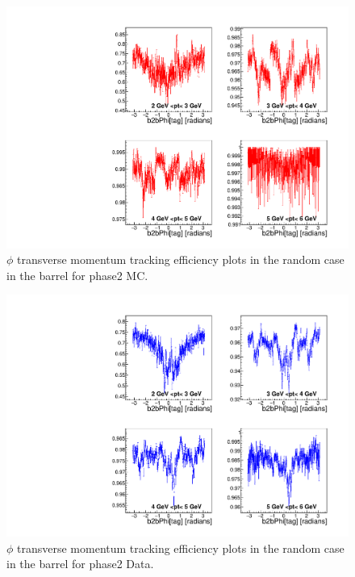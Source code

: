 \documentclass[a4paper,11pt,twosided,final,german,openbib,pdftex,listof=totoc,bibliography=totoc]{scrbook}
\begin{document}
\begin{appendix}
\clearpage
\begin{figure}[!htbp]
	\centering
	\includegraphics[width=\textwidth]{Plots/master/xPtMPhiRandomBarrel_MC}
	\caption[Transverse Momentum $\phi$ Random Barrel Efficiency Phase2 MC]{$\phi$ transverse momentum tracking efficiency plots in the random case in the barrel for phase2 MC.}
	\label{plt:PtMPhiRandomBarrel_MC}
\end{figure}


\begin{figure}[!htbp]
	\centering
	\includegraphics[width=\textwidth]{Plots/master/xPtMPhiRandomBarrel_Data}
	\caption[Transverse Momentum $\phi$ Random Barrel Efficiency Phase2 Data]{$\phi$ transverse momentum tracking efficiency plots in the random case in the barrel for phase2 Data.}
	\label{plt:PtMPhiRandomBarrel_Data}
\end{figure}



\end{appendix}
\end{document}
